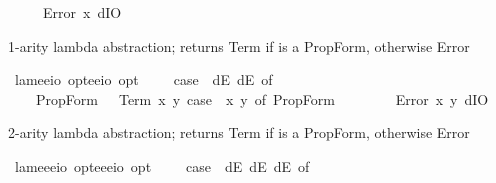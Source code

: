 \begin{isabellebody}
\ \ {\isacharbar}\ {\isacharunderscore}\ {\isasymRightarrow}\ Error\ {\isacharparenleft}{\isasymlambda}x{\isachardot}\ dIO{\isacharparenright}{\isachardoublequoteclose}%
\begin{isamarkuptext}%
1-arity lambda abstraction;  returns Term  if \isa{{\isasymphi}} is a PropForm, 
otherwise Error%
\end{isamarkuptext}%
\isamarkuptrue%
\isamarkupfalse%
\ lam{}{\isacharcolon}{\isacharcolon}{\isachardoublequoteopen}{\isacharparenleft}e{\isasymRightarrow}e{\isasymRightarrow}io\ opt{\isacharparenright}{\isasymRightarrow}{\isacharparenleft}e{\isasymRightarrow}e{\isasymRightarrow}io{\isacharparenright}\ opt{\isachardoublequoteclose}\ \ {\isachardoublequoteopen}{\isasymlambda}\ {\isasymPhi}\ {\isasymequiv}\ case\ {\isacharparenleft}{\isasymPhi}\ dE\ dE{\isacharparenright}\ of\isanewline
\ \ \ \ PropForm\ {\isasymphi}\ {\isasymRightarrow}\ Term\ {\isacharparenleft}{\isasymlambda}x\ y{\isachardot}\ case\ {\isacharparenleft}{\isasymPhi}\ x\ y{\isacharparenright}\ of\ PropForm\ {\isasymphi}\ {\isasymRightarrow}\ {\isasymphi}{\isacharparenright}\isanewline
\ \ {\isacharbar}\ {\isacharunderscore}\ {\isasymRightarrow}\ Error\ {\isacharparenleft}{\isasymlambda}x\ y{\isachardot}\ dIO{\isacharparenright}{\isachardoublequoteclose}%
\begin{isamarkuptext}%
2-arity lambda abstraction;  returns Term  if \isa{{\isasymphi}} is a PropForm, 
otherwise Error%
\end{isamarkuptext}%
\isamarkuptrue%
\isamarkupfalse%
\ lam{}{\isacharcolon}{\isacharcolon}{\isachardoublequoteopen}{\isacharparenleft}e{\isasymRightarrow}e{\isasymRightarrow}e{\isasymRightarrow}io\ opt{\isacharparenright}{\isasymRightarrow}{\isacharparenleft}e{\isasymRightarrow}e{\isasymRightarrow}e{\isasymRightarrow}io{\isacharparenright}\ opt{\isachardoublequoteclose}\ \ {\isachardoublequoteopen}{\isasymlambda}\ {\isasymPhi}\ {\isasymequiv}\ case\ {\isacharparenleft}{\isasymPhi}\ dE\ dE\ dE{\isacharparenright}\ of\isanewline

\end{isabellebody}
